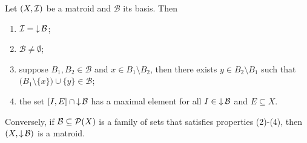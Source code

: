 \begin{proposition}
Let $\sSet{X,\mathcal{I}}$ be a matroid and $\mathcal{B}$ its basis. Then
\begin{enumerate}
\item $\mathcal{I} = \operatorname{\downarrow} \mathcal{B}$;
\item $\mathcal{B} \neq \emptyset$;
\item suppose $B_1,B_2\in \mathcal{B}$ and $x\in B_1\setminus B_2$, then there exists $y\in B_2\setminus B_1$ such that $\big(B_1\setminus\{x\}\big)\cup \{y\}\in \mathcal{B}$;
\item the set $\interval{I, E}\cap \downset\mathcal{B}$ has a maximal element for all $I\in \operatorname{\downarrow} \mathcal{B}$ and $E\subseteq X$.
\end{enumerate}
Conversely, if $\mathcal{B}\subseteq \operatorname{\mathcal{P}}(X)$ is a family of sets that satisfies properties (2)-(4), then $\sSet{X, \downset \mathcal{B}}$ is a matroid.
\end{proposition}

